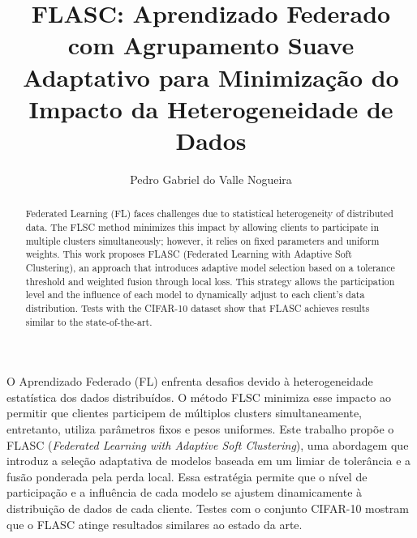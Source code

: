 \documentclass[12pt]{article}
\title{FLASC: Aprendizado Federado com Agrupamento Suave Adaptativo para Minimização do Impacto da Heterogeneidade de Dados}
\author{
  Pedro Gabriel do Valle Nogueira\inst{1}
}
\begin{document}
\maketitle

\begin{resumo}
  O Aprendizado Federado (FL) enfrenta desafios devido à heterogeneidade estatística dos dados distribuídos.
  O método FLSC minimiza esse impacto ao permitir que clientes participem de múltiplos clusters simultaneamente,
  entretanto, utiliza parâmetros fixos e pesos uniformes.
  Este trabalho propõe o FLASC (\textit{Federated Learning with Adaptive Soft Clustering}),
  uma abordagem que introduz a seleção adaptativa de modelos baseada em um limiar de tolerância e a fusão ponderada pela perda local.
  Essa estratégia permite que o nível de participação e a influência de cada modelo se ajustem dinamicamente à distribuição de dados de cada cliente.
  Testes com o conjunto CIFAR-10 mostram que o FLASC atinge resultados similares ao estado da arte.
\end{resumo}

\begin{abstract}
  Federated Learning (FL) faces challenges due to statistical heterogeneity of distributed data.
  The FLSC method minimizes this impact by allowing clients to participate in multiple clusters simultaneously;
  however, it relies on fixed parameters and uniform weights.
  This work proposes FLASC (Federated Learning with Adaptive Soft Clustering),
  an approach that introduces adaptive model selection based on a tolerance threshold and weighted fusion through local loss.
  This strategy allows the participation level and the influence of each model to dynamically adjust to each client's data distribution.
  Tests with the CIFAR-10 dataset show that FLASC achieves results similar to the state-of-the-art.
\end{abstract}









\end{document}
